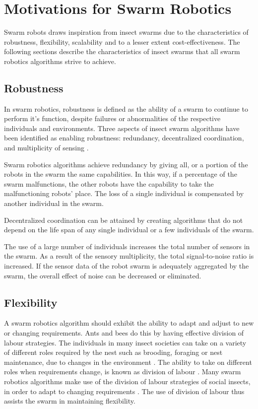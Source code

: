 \section{Motivations for Swarm Robotics}
\label{motivations}

Swarm robots draws inspiration from insect swarms due to the characteristics of robustness, flexibility, scalability and to a lesser extent cost-effectiveness. The following sections describe the characteristics of insect swarms that all swarm robotics algorithms strive to achieve. 

\subsection{Robustness}
\label{robustness}


In swarm robotics, robustness is defined as the ability of a swarm to continue to perform it's function, despite failures or abnormalities of the respective individuals and environments. Three aspects of insect swarm algorithms have been identified as enabling robustness: redundancy, decentralized coordination, and multiplicity of sensing \cite{csahin2005swarm}.

Swarm robotics algorithms achieve redundancy by giving all, or a portion of the robots in the swarm the same capabilities. In this way, if a percentage of the swarm malfunctions, the other robots have the capability to take the malfunctioning robots' place. The loss of a single individual is compensated by another individual in the swarm.

Decentralized coordination can be attained by creating algorithms that do not depend on the life span of any single individual or a few individuals of the swarm.

The use of a large number of individuals increases the total number of sensors in the swarm. As a result of the sensory multiplicity, the total signal-to-noise ratio is increased. If the sensor data of the robot swarm is adequately aggregated by the swarm, the overall effect of noise can be decreased or eliminated. 

\subsection{Flexibility}
\label{flexibility}

A swarm robotics algorithm should exhibit the ability to adapt and adjust to new or changing requirements. Ants and bees do this by having effective division of labour strategies. The individuals in many insect societies can take on a variety of different roles required by the nest such as brooding, foraging or nest maintenance, due to changes in the environment \cite{morley1946division}. The ability to take on different roles when requirements change, is known as division of labour \cite{beshers2001models}. Many swarm robotics algorithms make use of the division of labour strategies of social insects, in order to adapt to changing requirements  \cite{gerkey2004formal, labella2006division, liu2007towards}. The use of division of labour thus assists the swarm in maintaining flexibility.

